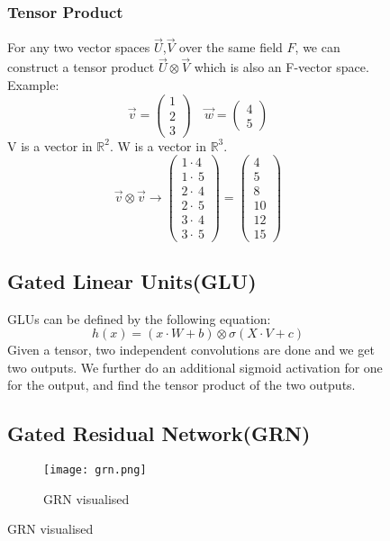 \documentclass{article}
\begin{document}
\begin{figure}[h!]
\subsubsection{Tensor Product}
For any two vector spaces $\vec{U}$,$\vec{V}$ over the same field $F$, we can construct a tensor product $\vec{U}\otimes\vec{V}$ which is also an F-vector space.\\
Example:
$$\vec{v}=\begin{pmatrix}1\\ 2\\ 3\end{pmatrix}\quad \vec{w}=\begin{pmatrix}4\\ 5\end{pmatrix}$$
V is a vector in $\mathbb{R}^{2}$. W is a vector in $\mathbb{R}^{3}$.
$$\vec{v}\otimes\vec{v} \rightarrow \begin{pmatrix}1\cdot 4\\ 1\cdot \:5\\ 2\cdot \:4\\ 2\cdot \:5\\ 3\cdot \:4\\ 3\cdot \:5\end{pmatrix}=\begin{pmatrix}4\\ 5\\ 8\\ 10\\ 12\\ 15\end{pmatrix}$$

\subsection{Gated Linear Units(GLU)}
GLUs can be defined by the following equation:
$$h(x)=(x\cdot W +b)\otimes \sigma(X\cdot V+c)$$
Given a tensor, two independent convolutions are done and we get two outputs. We further do an additional sigmoid activation for one for the output, and find the tensor product of the two outputs.


\subsection{Gated Residual Network(GRN)}
\begin{figure}[h]
    \centering
    \texttt{[image: grn.png]}
    \caption{GRN visualised}
\end{figure}


\end{figure}
\end{document}
